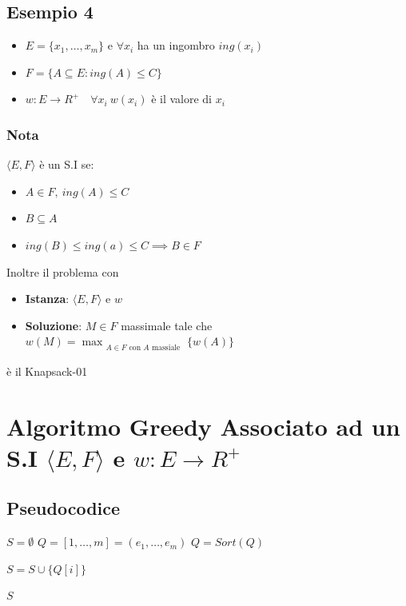 \subsection{Esempio 4}
\begin{itemize}
    \item $E = \{x_1 , \dots, x_m\}$ e $\forall x_i$ ha un ingombro $ing(x_i)$
    \item $F = \{A \subseteq E : ing(A) \leq C\}$
    \item $w : E \to R^+ \quad \forall x_i\ w(x_i)$ è il valore di $x_i$
\end{itemize}

\subsubsection{Nota}

$\langle E,F \rangle$ è un S.I se:
\begin{itemize}
    \item $A \in F,\ ing(A) \leq C$
    \item $B \subseteq A$
    \item $ing(B) \leq ing(a) \leq C \implies B \in F$
\end{itemize}

Inoltre il problema con 
\begin{itemize}
    \item \textbf{Istanza}: $\langle E,F \rangle \text{ e } w$
    \item \textbf{Soluzione}: $M \in F$ massimale tale che $w(M) = \max_{\substack{A \in F \text{ con } A \text{ massiale}}}\{w(A)\}$
\end{itemize}
è il Knapsack-01

\newpage
\section{Algoritmo Greedy Associato ad un S.I $\langle E,F \rangle$ e $w:E \to R^+$}

\subsection{Pseudocodice}
\begin{algorithmic}
     
        \State $S = \emptyset$
        \State $Q = [1, \dots, m] = (e_1, \dots, e_m)$
        \State $Q = Sort(Q)$ 

             
                \State $S = S \cup \{Q[i]\}$
            \EndIf
        \EndFor

        \State \Return $S$
    \EndProcedure
\end{algorithmic}

